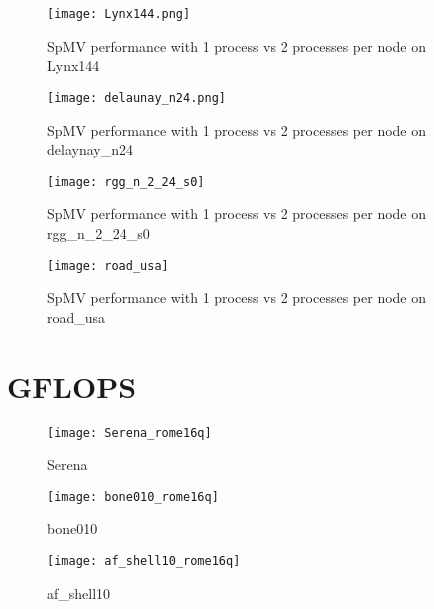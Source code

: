 \begin{figure}[H]
    \centering
    \texttt{[image: Lynx144.png]}
    \caption{SpMV performance with 1 process vs 2 processes per node on Lynx144}
    \label{fig:lynx144gflops}
\end{figure}

\begin{figure}[H]
    \centering
    \texttt{[image: delaunay\_n24.png]}
    \caption{SpMV performance with 1 process vs 2 processes per node on delaynay\_n24}
    \label{fig:delaunayflops}
\end{figure}

\begin{figure}[H]
    \begin{center}
        \texttt{[image: rgg\_n\_2\_24\_s0]}
    \end{center}
    \caption{SpMV performance with 1 process vs 2 processes per node on rgg\_n\_2\_24\_s0}
    \label{fig:rgg_n_2_24_s0}
\end{figure}

\begin{figure}[H]
    \begin{center}
        \texttt{[image: road\_usa]}
    \end{center}
    \caption{SpMV performance with 1 process vs 2 processes per node on road\_usa}
    \label{fig:road_usa}
\end{figure}


\section{GFLOPS \romeq}

\begin{figure}[H]
    \begin{center}
        \texttt{[image: Serena\_rome16q]}
    \end{center}
    \caption{Serena}
    \label{fig:Serena_rome16q}
\end{figure}

\begin{figure}[H]
    \begin{center}
        \texttt{[image: bone010\_rome16q]}
    \end{center}
    \caption{bone010}
    \label{fig:bone010_rome16q}
\end{figure}

\begin{figure}[H]
    \begin{center}
        \texttt{[image: af\_shell10\_rome16q]}
    \end{center}
    \caption{af\_shell10}
    \label{fig:af_shell10_rome16q}
\end{figure}

